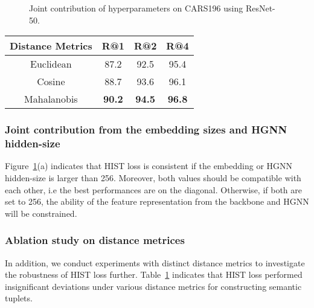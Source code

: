 \begin{figure}[htbp]
    \centering
    \caption{Joint contribution of hyperparameters on CARS196 using ResNet-50.}
   \label{hyperparmeters2}
\end{figure}

\begin{table}[ht!]
		\centering
            \begin{tabular}{cccc}
            \toprule[0.8pt]
            \textbf{Distance Metrics} & \textbf{R@1}  & \textbf{R@2}  & \textbf{R@4}  \\ \hline
            Euclidean        & 87.2 & 92.5 & 95.4 \\
            Cosine           & 88.7 & 93.6 & 96.1 \\
            Mahalanobis      & \textbf{90.2} & \textbf{94.5} & \textbf{96.8} \\
            \bottomrule[0.8pt]
            \end{tabular}
       \label{fig:distance metrices}
\end{table}

\subsubsection{Joint contribution from the embedding sizes and HGNN hidden-size}Figure~\ref{hyperparmeters2}(a) indicates that HIST loss is consistent if the embedding or HGNN hidden-size is larger than 256. Moreover, both values should be compatible with each other, i.e the best performances are on the diagonal. Otherwise, if both are set to 256, the ability of the feature representation from the backbone and HGNN will be constrained.
\subsubsection{Ablation study on distance metrices}In addition, we conduct experiments with distinct distance metrics to investigate the robustness of HIST loss further. Table~\ref{fig:distance metrices} indicates that HIST loss performed insignificant deviations under various distance metrics for constructing semantic tuplets.


